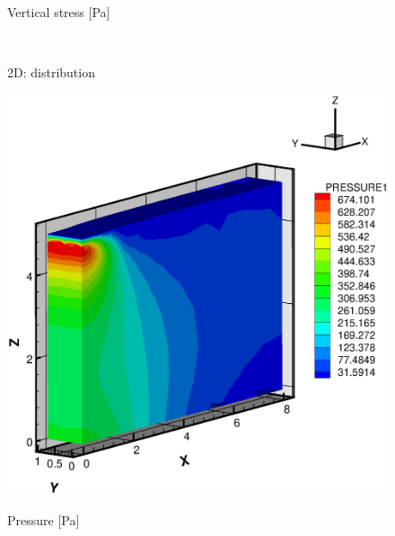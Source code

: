 \begin{figure}[!thb]
\begin{center}
\begin{minipage}[t]{0.45\textwidth}
\begin{center}
    \centerline{Vertical stress [Pa]}
    \end{center}
   \end{minipage}\\
  \end{center}
  \caption{2D: distribution}
  \label{fig:e10}
\end{figure}
\begin{figure}[!htb]
  \begin{center}
   \begin{minipage}[t]{0.40\textwidth}
     \begin{center}
    \includegraphics[scale=0.25]{HM/HM3D/pre3d.eps}
    \centerline{Pressure [Pa]}
    \end{center}
   \end{minipage}
   \begin{minipage}[t]{0.4\textwidth}
    \begin{center}

\end{center}
\end{minipage}
\end{center}
\end{figure}
